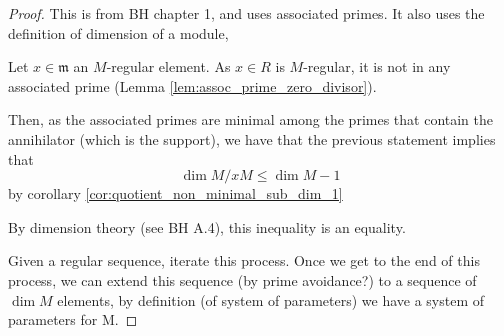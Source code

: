 \begin{proof}

    This is 
    from BH chapter 1, and uses associated primes.
    It also uses the definition of dimension of a module,
    
    Let \(x \in \mathfrak{m}\) an \(M\)-regular element.
    As \(x \in R\) is \(M\)-regular,  
    it is not in any associated prime (Lemma \ref{lem:assoc_prime_zero_divisor}).
    
    Then, as the associated primes are minimal among the primes
    that contain the annihilator (which is the support),
    we have that the previous statement implies that
    \[
    \dim M / xM \leq \dim M - 1
    \] 
    by corollary \ref{cor:quotient_non_minimal_sub_dim_1}
    
    By dimension theory (see BH A.4), this inequality is an equality.
    
    Given a regular sequence, iterate this process. 
    Once we get to the end of this process, we can extend this sequence
    (by prime avoidance?)
    to a sequence of
    \(\dim M\) elements, by definition (of system of parameters) we have a system of
    parameters for M.

\end{proof}


